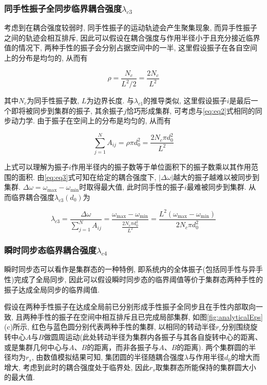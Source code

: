 \documentclass{article}
\begin{document}
\subsubsection{同手性振子全同步临界耦合强度$\lambda_{c3}$}

考虑到在耦合强度较弱时, 同手性振子的运动轨迹会产生聚集现象, 而异手性振子之间的轨迹会相互排斥, 因此可以假设在耦合强度与作用半径小于且充分接近临界值的情况下, 两种手性的振子会分别占据空间中的一半, 这里假设振子在各自空间上的分布是均匀的, 从而有

\begin{equation}\label{eq:eq5.5}
	\rho =\frac{N_c}{L^2/2}=\frac{2N_c}{L^2}
\end{equation}

其中$N_c$为同手性振子数, $L$为边界长度. 与$\lambda_{c1}$的推导类似, 这里假设振子$i$是最后一个即将被同步到集群的振子, 其余振子$j$恰巧形成集群, 可考虑与\ref{eq:eq2}式相同的同步动力学. 由于振子在空间上的分布是均匀的, 从而有

$$
\sum_{j=1}^N{A_{ij}}=\rho \pi d_{0}^{2}=\frac{2N_c\pi d_{0}^{2}}{L^2}
$$

上式可以理解为振子$i$作用半径内的振子数等于单位面积下的振子数乘以其作用范围的面积. 由\ref{eq:eq3}式可知在给定的耦合强度下, $\left| \Delta \omega \right|$越大的振子越难以被同步到集群. $\Delta \omega =\omega _{\max}-\omega _{\min}$时取得最大值, 此时同手性的振子$i$最难被同步到集群. 从而临界耦合强度$\lambda_{c3}(d_0)$为

\begin{equation}\label{eq:eq6}
	\lambda _{c3}=\frac{\Delta \omega}{\sum_{j=1}^N{A_{ij}}}=\frac{\omega _{\max}-\omega _{\min}}{\frac{2N_c\pi d_{0}^{2}}{L^2}}=\frac{L^2\left( \omega _{\max}-\omega _{\min} \right)}{2N_c\pi d_{0}^{2}}
\end{equation}

\subsubsection{瞬时同步态临界耦合强度$\lambda_{c4}$}

瞬时同步态可以看作是集群态的一种特例, 即系统内的全体振子(包括同手性与异手性)完成了全局同步, 因此可以假设瞬时同步态的临界阈值等价于集群态两种手性的振子达成全局同步的临界阈值.

假设在两种手性振子在达成全局前已分别形成手性振子全同步且在手性内部取向一致, 且两种手性的振子在空间中相互排斥且已完成局部集群, 如图\ref{fig:analyticalEps} (c)所示, 红色与蓝色圆分别代表两种手性的集群, 以相同的转动半径$r_c$分别围绕旋转中心$A$与$B$做圆周运动(此处转动半径为集群内各振子与其各自旋转中心的距离、或是集群几何中心与$A$、$B$的距离，而非各振子与$A$、$B$的距离). 两个集群圆的半径均为$r_s$, 由数值模拟结果可知, 集团圆的半径随耦合强度$\lambda$与作用半径$d_0$的增大而增大, 考虑到此时的耦合强度处于临界处, 因此$r_s$取集群态所能保持的集群圆大小的最大值.
\end{document}
